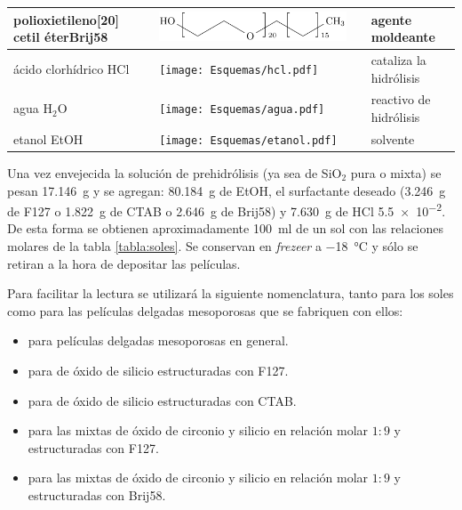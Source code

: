 \begin{table}[ht!]
\begin{tabular}{>{\raggedright\arraybackslash}m{2.40cm}>{\centering\arraybackslash}m{4cm}>{\centering\arraybackslash}m{2.35cm}>{\raggedright\arraybackslash}m{1.7cm}}
				  		   polioxietileno[20] cetil éter\hspace{2cm}Brij58   & \hspace*{0.5cm}\includegraphics[scale=0.65]{Esquemas/brij58.pdf} & \multirow{1}{*}{$1124$}	 & agente moldeante	 \\ \midrule
				  		  ácido clorhídrico HCl& \texttt{[image: Esquemas/hcl.pdf]}  & \multirow{1}{*}{$36,46$}   & cataliza la hidrólisis \\ \midrule
				  		  agua \hspace{2cm} H$_2$O  &  \texttt{[image: Esquemas/agua.pdf]}  & \multirow{1}{*}{$18,02$}   & reactivo de hidrólisis \\ \midrule
				  		  etanol \hspace{2cm} EtOH  & \texttt{[image: Esquemas/etanol.pdf]}  & \multirow{1}{*}{$46,07$}   & solvente \\ 
				  		  \bottomrule
				    	  \end{tabular}
				   		  \label{tabla:reactivos}
					      \end{table}
			\vspace*{-0.6cm}			      
			Una vez envejecida la solución de prehidrólisis (ya sea de SiO$_2$ pura o mixta) se pesan  \SI{17.146}{\gram} y se agregan: \SI{80.184}{\gram} de EtOH, el surfactante deseado (\SI{3.246}{\gram} de F127 o \SI{1.822}{\gram} de CTAB o \SI{2.646}{\gram} de Brij58) y \SI{7.630}{\gram} de HCl \SI{5,5e-2}{\Molar}. De esta forma se obtienen aproximadamente \SI{100}{\ml} de un sol con las relaciones molares de la tabla \ref{tabla:soles}. Se conservan en \textit{frezeer} a \SI{-18}{\celsius} y sólo se retiran a la hora de depositar las películas. 

			Para facilitar la lectura se utilizará la siguiente nomenclatura, tanto para los soles como para las películas delgadas mesoporosas que se fabriquen con ellos: 

				\begin{itemize}
			     \item \pdm\space para películas delgadas mesoporosas en general.
			     \item \pdmF\space para \pdm\space de óxido de silicio estructuradas con F127. 
			     \item \pdmC\space para \pdm\space de óxido de silicio estructuradas con CTAB.
			     \item \pdmZ\space para las \pdm\space mixtas de óxido de circonio y silicio en relación molar $1\!:\!9$ y estructuradas con F127.
			     \item \pdmZB\space para las \pdm\space mixtas de óxido de circonio y silicio en relación molar $1\!:\!9$ y estructuradas con Brij58. 
      		     \end{itemize}	
			
